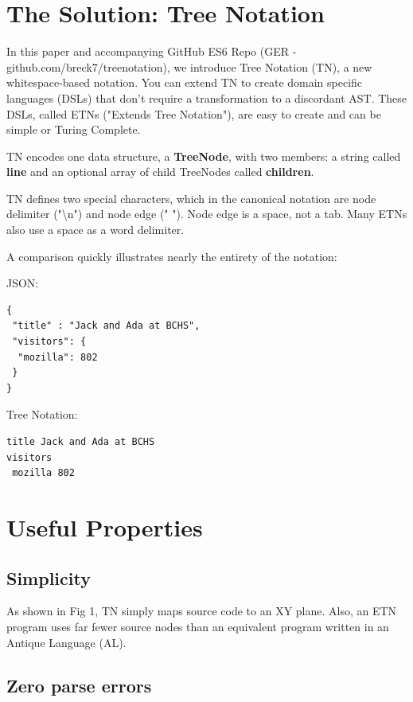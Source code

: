 \documentclass[journal]{IEEEtran}
\begin{document}
\section{The Solution: Tree Notation}

In this paper and accompanying GitHub ES6 Repo (GER - github.com/breck7/treenotation), we introduce Tree Notation (TN), a new whitespace-based notation. You can extend TN to create domain specific languages (DSLs) that don't require a transformation to a discordant AST. These DSLs, called ETNs ("Extends Tree Notation"), are easy to create and can be simple or Turing Complete.

TN encodes one data structure, a \textbf{TreeNode}, with two members: a string called \textbf{line} and an optional array of child TreeNodes called \textbf{children}.

TN defines two special characters, which in the canonical notation are node delimiter ("\textbackslash n") and node edge (" "). Node edge is a space, not a tab. Many ETNs also use a space as a word delimiter.

A comparison quickly illustrates nearly the entirety of the notation:

JSON:

\begin{lstlisting}
{
 "title" : "Jack and Ada at BCHS",
 "visitors": {
  "mozilla": 802
 }
}
\end{lstlisting}

Tree Notation:

\begin{lstlisting}
title Jack and Ada at BCHS
visitors
 mozilla 802
\end{lstlisting}

\section{Useful Properties}

\subsection{Simplicity}

As shown in Fig 1, TN simply maps source code to an XY plane. Also, an ETN program uses far fewer source nodes than an equivalent program written in an Antique Language (AL).

\subsection{Zero parse errors}
\end{document}
